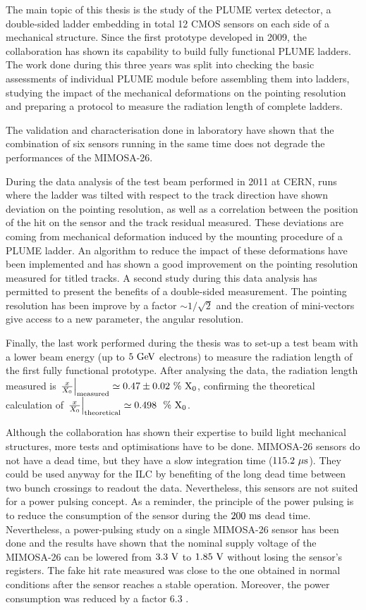 The main topic of this thesis is the study of the \gls{PLUME} vertex detector, a double-sided ladder embedding in total 12 \gls{CMOS} sensors on each side of a mechanical structure.
Since the first prototype developed in 2009, the collaboration has shown its capability to build fully functional \gls{PLUME} ladders.
The work done during this three years was split into checking the basic assessments of individual \gls{PLUME} module before assembling them into ladders, studying the impact of the mechanical deformations on the pointing resolution and preparing a protocol to measure the radiation length of complete ladders.

The validation and characterisation done in laboratory have shown that the combination of six sensors running in the same time does not degrade the performances of the \gls{MIMOSA}-26.

During the data analysis of the test beam performed in 2011 at \gls{CERN}, runs where the ladder was tilted with respect to the track direction have shown deviation on the pointing resolution, as well as a correlation between the position of the hit on the sensor and the track residual measured.
These deviations are coming from mechanical deformation induced by the mounting procedure of a \gls{PLUME} ladder.
An algorithm to reduce the impact of these deformations have been implemented and has shown a good improvement on the pointing resolution measured for titled tracks.
A second study during this data analysis has permitted to present the benefits of a double-sided measurement. 
The pointing resolution has been improve by a factor $\sim 1/\sqrt{2}$ and the creation of mini-vectors give access to a new parameter, the angular resolution.

Finally, the last work performed during the thesis was to set-up a test beam with a lower beam energy (up to $5~\rm{GeV}$ electrons) to measure the radiation length of the first fully functional prototype.
After analysing the data, the radiation length measured is $\left. \frac{x}{X_0} \right|_{\rm{measured}} \simeq 0.47 \pm 0.02~\%~\rm{X_0}$, confirming the theoretical calculation of $\left. \frac{x}{X_0}\right|_{\rm{theoretical}} \simeq 0.498~~\%~\rm{X_0}$.

Although the collaboration has shown their expertise to build light mechanical structures, more tests and optimisations have to be done.
\gls{MIMOSA}-26 sensors do not have a dead time, but they have a slow integration time ($115.2~\rm{\mu s}$).
They could be used anyway for the \gls{ILC} by benefiting of the long dead time between two bunch crossings to readout the data. 
Nevertheless, this sensors are not suited for a power pulsing concept.
As a reminder, the principle of the power pulsing is to reduce the consumption of the sensor during the $200~\rm{ms}$ dead time. 
Nevertheless, a power-pulsing study on a single \gls{MIMOSA}-26 sensor has been done and the results have shown that the nominal supply voltage of the \gls{MIMOSA}-26 can be lowered from $3.3~\rm{V}$ to $1.85~\rm{V}$ without losing the sensor's registers. 
The fake hit rate measured was close to the one obtained in  normal conditions after the sensor reaches a stable operation.
Moreover, the power consumption was reduced by a factor 6.3 \cite{Kuprash2013}. 

